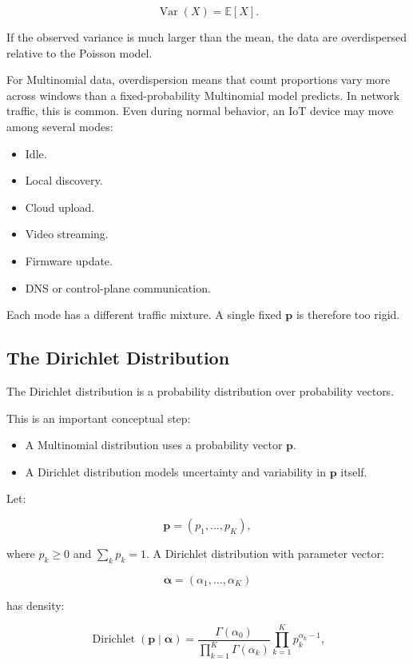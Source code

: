 \documentclass[11pt,a4paper]{article}
\begin{document}
\[
\operatorname{Var}(X)=\mathbb{E}[X].
\]

If the observed variance is much larger than the mean, the data are overdispersed relative to the Poisson model.

For Multinomial data, overdispersion means that count proportions vary more across windows than a fixed-probability Multinomial model predicts. In network traffic, this is common. Even during normal behavior, an IoT device may move among several modes:

\begin{itemize}
  \item Idle.
  \item Local discovery.
  \item Cloud upload.
  \item Video streaming.
  \item Firmware update.
  \item DNS or control-plane communication.
\end{itemize}

Each mode has a different traffic mixture. A single fixed \(\mathbf{p}\) is therefore too rigid.

\subsection{The Dirichlet Distribution}

The Dirichlet distribution is a probability distribution over probability vectors.

This is an important conceptual step:

\begin{itemize}
  \item A Multinomial distribution uses a probability vector \(\mathbf{p}\).
  \item A Dirichlet distribution models uncertainty and variability in \(\mathbf{p}\) itself.
\end{itemize}

Let:

\[
\mathbf{p}=(p_1,\ldots,p_K),
\]

where \(p_k \geq 0\) and \(\sum_k p_k=1\). A Dirichlet distribution with parameter vector:

\[
\boldsymbol{\alpha}=(\alpha_1,\ldots,\alpha_K)
\]

has density:

\[
\operatorname{Dirichlet}(\mathbf{p}\mid\boldsymbol{\alpha})
=
\frac{\Gamma(\alpha_0)}{\prod_{k=1}^{K}\Gamma(\alpha_k)}
\prod_{k=1}^{K}p_k^{\alpha_k-1},
\]
\end{document}
